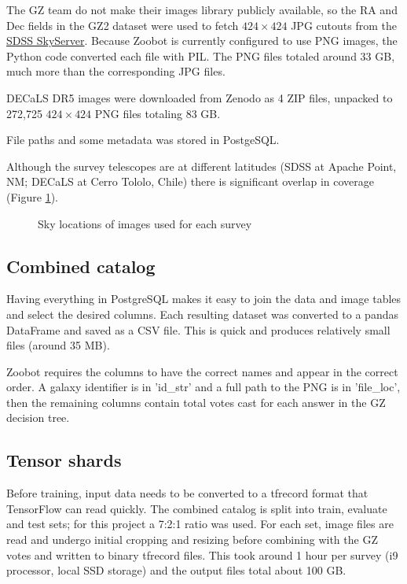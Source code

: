 \documentclass[preprint]{aastex63}
\begin{document}
The GZ team do not make their images library publicly available, so the RA and Dec fields in the GZ2 dataset were used to fetch $424 \times 424$ JPG cutouts from the \href{http://skyserver.sdss.org/dr14/SkyServerWS/ImgCutout/getjpeg}{SDSS SkyServer}. Because Zoobot is currently configured to use PNG images, the Python code converted each file with PIL. The PNG files totaled around 33 GB, much more than the corresponding JPG files.

DECaLS DR5 images were downloaded from Zenodo \citep{walmsley_mike_2020_4573248} as 4 ZIP files, unpacked to 272,725 $424 \times 424$ PNG files totaling 83 GB. 

File paths and some metadata was stored in PostgeSQL.

Although the survey telescopes are at different latitudes (SDSS at Apache Point, NM; DECaLS at Cerro Tololo, Chile) there is significant overlap in coverage (Figure \ref{fig:coverage}).

\begin{figure}[htb!]
	\caption{Sky locations of images used for each survey
		\label{fig:coverage}}
\end{figure}



\subsection{Combined catalog}

Having everything in PostgreSQL makes it easy to join the data and image tables and select the desired columns. Each resulting dataset was converted to a pandas DataFrame and saved as a CSV file. This is quick and produces relatively small files (around 35 MB).

Zoobot requires the columns to have the correct names and appear in the correct order. A galaxy identifier is in 'id\_str' and a full path to the PNG is in 'file\_loc', then the remaining columns contain total votes cast for each answer in the GZ decision tree.

\subsection{Tensor shards}

Before training, input data needs to be converted to a tfrecord format that TensorFlow can read quickly. The combined catalog is split into train, evaluate and test sets; for this project a 7:2:1 ratio was used. For each set, image files are read and undergo initial cropping and resizing before combining with the GZ votes and written to binary tfrecord files. This took around 1 hour per survey (i9 processor, local SSD storage) and the output files total about 100 GB.
\end{document}
